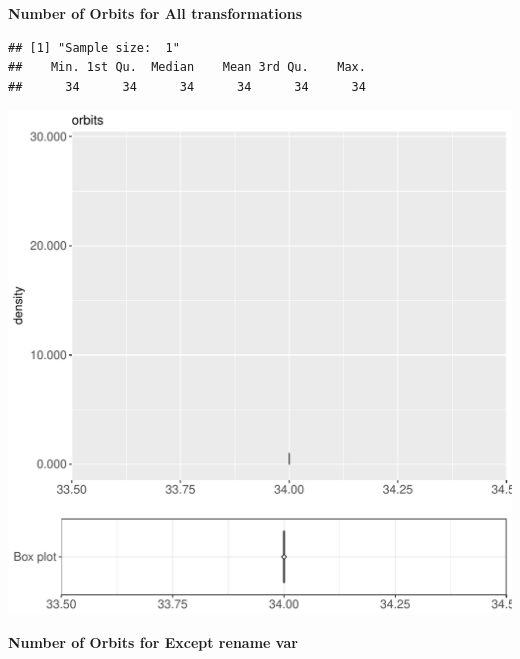 \documentclass{article}\usepackage[]{graphicx}\usepackage[]{color}
\makeatletter
\def\maxwidth{ %
  \ifdim\Gin@nat@width>\linewidth
    \linewidth
  \else
    \Gin@nat@width
  \fi
}
\newenvironment{kframe}{%
 \def\at@end@of@kframe{}%
 \ifinner\ifhmode%
  \def\at@end@of@kframe{\end{minipage}}%
  \begin{minipage}{\columnwidth}%
 \fi\fi%
 \def\FrameCommand##1{\hskip\@totalleftmargin \hskip-\fboxsep
 \colorbox{shadecolor}{##1}\hskip-\fboxsep
     \hskip-\linewidth \hskip-\@totalleftmargin \hskip\columnwidth}%
 \MakeFramed {\advance\hsize-\width
   \@totalleftmargin\z@ \linewidth\hsize
   \@setminipage}}%
 {\par\unskip\endMakeFramed%
 \at@end@of@kframe}
\newenvironment{knitrout}{}{} %
\makeatother
\begin{document}
 \textbf{Number of Orbits for All transformations}
\begin{knitrout}
\color{fgcolor}\begin{kframe}
\begin{verbatim}
## [1] "Sample size:  1"
##    Min. 1st Qu.  Median    Mean 3rd Qu.    Max. 
##      34      34      34      34      34      34
\end{verbatim}


{\ttfamily\noindent\bfseries{}}\end{kframe}
\includegraphics[width=\maxwidth]{figure/RH9_cashew_big-1} 

\end{knitrout}
 \textbf{Number of Orbits for Except rename var}
\end{document}
